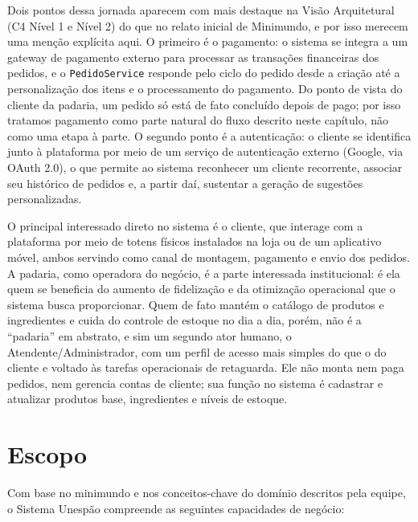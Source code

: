 \documentclass[a4paper,12pt,oneside,openany]{book}
\begin{document}
Dois pontos dessa jornada aparecem com mais destaque na Visão Arquitetural (C4 Nível 1 e Nível 2) do que no relato inicial de Minimundo, e por isso merecem uma menção explícita aqui. O primeiro é o pagamento: o sistema se integra a um gateway de pagamento externo para processar as transações financeiras dos pedidos, e o \texttt{PedidoService} responde pelo ciclo do pedido desde a criação até a personalização dos itens e o processamento do pagamento. Do ponto de vista do cliente da padaria, um pedido só está de fato concluído depois de pago; por isso tratamos pagamento como parte natural do fluxo descrito neste capítulo, não como uma etapa à parte. O segundo ponto é a autenticação: o cliente se identifica junto à plataforma por meio de um serviço de autenticação externo (Google, via OAuth 2.0), o que permite ao sistema reconhecer um cliente recorrente, associar seu histórico de pedidos e, a partir daí, sustentar a geração de sugestões personalizadas.

O principal interessado direto no sistema é o cliente, que interage com a plataforma por meio de totens físicos instalados na loja ou de um aplicativo móvel, ambos servindo como canal de montagem, pagamento e envio dos pedidos. A padaria, como operadora do negócio, é a parte interessada institucional: é ela quem se beneficia do aumento de fidelização e da otimização operacional que o sistema busca proporcionar. Quem de fato mantém o catálogo de produtos e ingredientes e cuida do controle de estoque no dia a dia, porém, não é a ``padaria'' em abstrato, e sim um segundo ator humano, o Atendente/Administrador, com um perfil de acesso mais simples do que o do cliente e voltado às tarefas operacionais de retaguarda. Ele não monta nem paga pedidos, nem gerencia contas de cliente; sua função no sistema é cadastrar e atualizar produtos base, ingredientes e níveis de estoque.

\section{Escopo}

Com base no minimundo e nos conceitos-chave do domínio descritos pela equipe, o Sistema Unespão compreende as seguintes capacidades de negócio:
\end{document}

